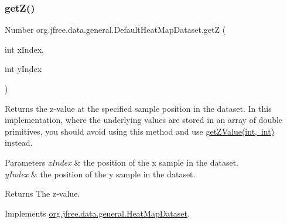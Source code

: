 \mbox{\label{classorg_1_1jfree_1_1data_1_1general_1_1_default_heat_map_dataset_a8d76ab265c9da8926a9d956f9a3bdc28}} 
\subsubsection{\texorpdfstring{get\+Z()}{getZ()}}
{\footnotesize\ttfamily Number org.\+jfree.\+data.\+general.\+Default\+Heat\+Map\+Dataset.\+getZ (\begin{DoxyParamCaption}\item[{int}]{x\+Index,  }\item[{int}]{y\+Index }\end{DoxyParamCaption})}

Returns the z-\/value at the specified sample position in the dataset. In this implementation, where the underlying values are stored in an array of double primitives, you should avoid using this method and use \mbox{\hyperlink{classorg_1_1jfree_1_1data_1_1general_1_1_default_heat_map_dataset_a93219a73fd817685f8e9ea06ad9d570b}{get\+Z\+Value(int, int)}} instead.


\begin{DoxyParams}{Parameters}
{\em x\+Index} & the position of the x sample in the dataset. \\
\hline
{\em y\+Index} & the position of the y sample in the dataset.\\
\hline
\end{DoxyParams}
\begin{DoxyReturn}{Returns}
The z-\/value. 
\end{DoxyReturn}


Implements \mbox{\hyperlink{interfaceorg_1_1jfree_1_1data_1_1general_1_1_heat_map_dataset_a9f2a3fb4e25c9364781e0aeb32ef91c5}{org.\+jfree.\+data.\+general.\+Heat\+Map\+Dataset}}.

\mbox{\label{classorg_1_1jfree_1_1data_1_1general_1_1_default_heat_map_dataset_a93219a73fd817685f8e9ea06ad9d570b}} 

